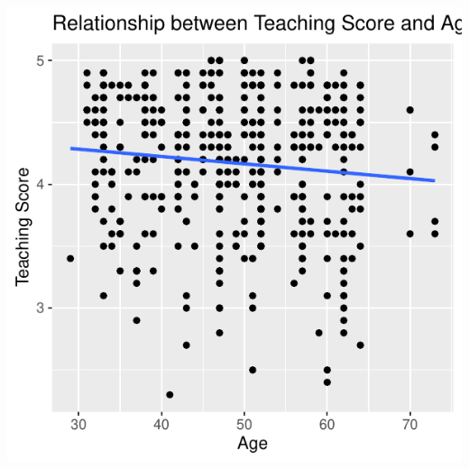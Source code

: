 \documentclass[
  letterpaper,
  DIV=11,
  numbers=noendperiod]{scrartcl}
\begin{document}
\begin{tcolorbox}
\begin{center}
\includegraphics{about_files/figure-pdf/unnamed-chunk-3-1.pdf}
\end{center}

\end{tcolorbox}
\end{document}
